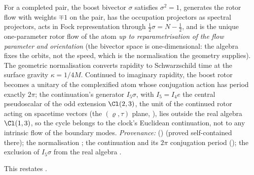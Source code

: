 For a completed pair, the boost bivector $\sigma$ satisfies $\sigma^2 = 1$, generates the rotor flow with weights $\mp 1$ on the pair, has the occupation projectors as spectral projectors, acts in Fock representation through $\tfrac12\sigma = N - \tfrac12$, and is the unique one-parameter rotor flow of the atom \emph{up to reparametrisation of the flow parameter and orientation} (the bivector space is one-dimensional: the algebra fixes the orbits, not the speed, which is the normalisation the geometry supplies). The geometric normalisation converts rapidity to Schwarzschild time at the surface gravity $\kappa = 1/4M$. Continued to imaginary rapidity, the boost rotor becomes a unitary of the complexified atom whose conjugation action has period exactly $2\pi$; the continuation's generator $I_{5}\sigma$, with $I_{5} = I_{4}e$ the central pseudoscalar of the odd extension $\Cl(2,3)$, the unit of the continued rotor acting on spacetime vectors (the $(\varrho, \tau)$ plane, ), lies outside the real algebra $\Cl(1,3)$, so the cycle belongs to the clock's Euclidean continuation, not to any intrinsic flow of the boundary modes. \emph{Provenance:} \cite[Prop.~2.1]{ButlerT7} () (proved self-contained there); the normalisation \cite[App.~A]{ButlerT5}; the continuation and its $2\pi$ conjugation period \cite[Prop.~7.21(1)]{ButlerT5} (); the exclusion of $I_{5}\sigma$ from the real algebra \cite[Prop.~7.21(3)]{ButlerT5}.

This restates .
